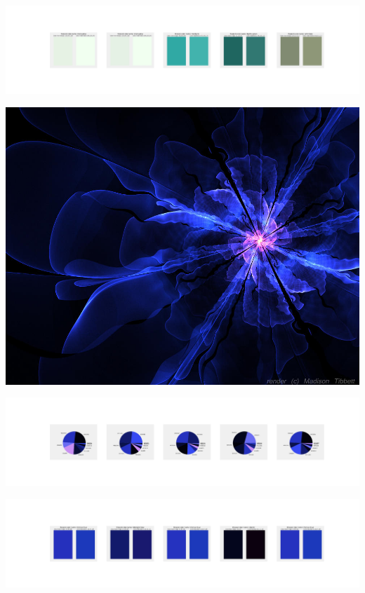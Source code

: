 \documentclass[11pt]{article}
\begin{document}
\begin{landscape}
    \begin{center}
    \includegraphics[width=250mm]{./nbimg/peak-395.jpg}
    \end{center}
    

    \begin{center}
    \includegraphics[width=\textwidth]{./nbimg/file (5).jpg}
    \end{center}

    \begin{center}
    \includegraphics[width=250mm]{./nbimg/pie-396.jpg}
    \end{center}

    \begin{center}
    \includegraphics[width=250mm]{./nbimg/peak-396.jpg}
    \end{center}
    


\end{landscape}
\end{document}
